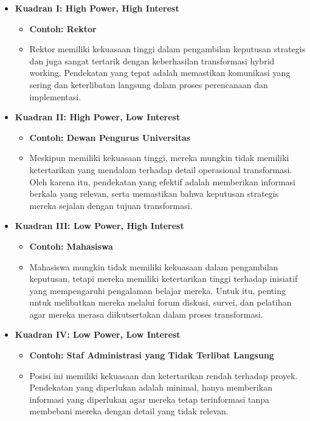 \begin{itemize}
	\item \textbf{Kuadran I: High Power, High Interest}
	\begin{itemize}
		\item \textbf{Contoh: Rektor}
		\item Rektor memiliki kekuasaan tinggi dalam pengambilan keputusan strategis dan juga sangat tertarik dengan keberhasilan transformasi hybrid working. Pendekatan yang tepat adalah memastikan komunikasi yang sering dan keterlibatan langsung dalam proses perencanaan dan implementasi.
	\end{itemize}
	
	\item \textbf{Kuadran II: High Power, Low Interest}
	\begin{itemize}
		\item \textbf{Contoh: Dewan Pengurus Universitas}
		\item Meskipun memiliki kekuasaan tinggi, mereka mungkin tidak memiliki ketertarikan yang mendalam terhadap detail operasional transformasi. Oleh karena itu, pendekatan yang efektif adalah memberikan informasi berkala yang relevan, serta memastikan bahwa keputusan strategis mereka sejalan dengan tujuan transformasi.
	\end{itemize}
	
	\item \textbf{Kuadran III: Low Power, High Interest}
	\begin{itemize}
		\item \textbf{Contoh: Mahasiswa}
		\item Mahasiswa mungkin tidak memiliki kekuasaan dalam pengambilan keputusan, tetapi mereka memiliki ketertarikan tinggi terhadap inisiatif yang mempengaruhi pengalaman belajar mereka. Untuk itu, penting untuk melibatkan mereka melalui forum diskusi, survei, dan pelatihan agar mereka merasa diikutsertakan dalam proses transformasi.
	\end{itemize}
	
	\item \textbf{Kuadran IV: Low Power, Low Interest}
	\begin{itemize}
		\item \textbf{Contoh: Staf Administrasi yang Tidak Terlibat Langsung}
		\item Posisi ini memiliki kekuasaan dan ketertarikan rendah terhadap proyek. Pendekatan yang diperlukan adalah minimal, hanya memberikan informasi yang diperlukan agar mereka tetap terinformasi tanpa membebani mereka dengan detail yang tidak relevan.
	\end{itemize}
\end{itemize}


